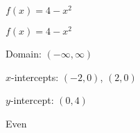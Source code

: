 {$f(x) = 4-x^2$}
{$f(x) = 4-x^2$

Domain: $(-\infty, \infty)$ 

$x$-intercepts: $(-2,0)$, $(2,0)$

$y$-intercept: $\left(0, 4 \right)$ 

Even

\begin{center}
\end{center}
}